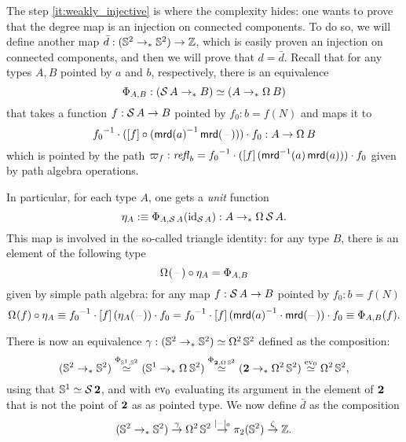 \documentclass[english,a4]{article}
\renewcommand{\ap}[1]{\left[{#1}\right]}
\newcommand{\ptdto}{\to_\ast}%
\newcommand{\settrunc}[1]{\trunc{#1}_0}
\begin{document}
The step \ref{it:weakly_injective} 
is where the complexity hides: one wants to prove that the degree
map is an injection on connected components. To do so, we will define
another map $\bar d: (\Sp \ptdto \Sp) \to \ZZ$, which is easily proven an
injection on connected components, and then we will prove that $d = \bar d$.
Recall that for any types $A,B$ pointed by $a$ and $b$,
respectively, there is an equivalence
\begin{displaymath}
  \Phi_{A,B}: (\susp A \ptdto B) \weq (A \ptdto \loopspace \null B) 
\end{displaymath}
that takes a function $f:\operatorname{\mathcal S} A \to B$ pointed by $f_0:b=f(N)$ and maps it to 
\begin{displaymath}
  \inv {f_0}\cdot (\ap f\circ (\inv{\mrd(a)}\mrd(\blank)))\cdot f_0 : A \to \loopspace\null B
\end{displaymath}
which is pointed by the path $\varpi_{f}:\refl b = \inv {f_0} \cdot (\ap f (\inv
\mrd(a)\mrd(a))) \cdot f_0$ given by path algebra operations.

In particular, for each type $A$, one gets a {\em unit} function 
\begin{displaymath}
  \eta_A \defequi \Phi_{A,\susp A}(\id_{\susp A}): A \ptdto \loopspace\null\susp A.
\end{displaymath}
This map is involved in the so-called triangle identity: for any type $B$,
there is an element of the following type
\begin{equation}
  \loopspace\null(\blank) \circ \eta_A = \Phi_{A,B}
  \label{eq:triangle-identity-unit}
\end{equation}
given by simple path algebra: for any map $f:\operatorname{\mathcal S} A \to B$ pointed by $f_0:b=f(N)$
\begin{displaymath}
  \loopspace\null(f) \circ \eta_A \jdeq \inv {f_0} \cdot \ap f (\eta_A(\blank)) \cdot f_0 
  = \inv {f_0} \cdot \ap f (\inv{\mrd(a)}\cdot\mrd(\blank)) \cdot f_0 \jdeq \Phi_{A,B}(f). 
\end{displaymath}

There is now an equivalence $\gamma:(\Sp \ptdto \Sp) \weq \loopspace 2 \Sp$ defined as
the composition:
\begin{displaymath}
  (\Sp \ptdto \Sp) \stackrel{\Phi_{\Sc,\Sp}}\weq 
  (\Sc \ptdto\loopspace\null \Sp) \stackrel{\Phi_{\bn 2,\loopspace\null\Sp}}\weq 
  (\bn 2\ptdto\loopspace 2 \Sp) \stackrel{\ev_0}\weq 
  \loopspace 2 \Sp,
\end{displaymath}
using that ${{\mathbb S^{1}}} \simeq \operatorname{\mathcal S}{\mathbf{2}}$, and with $\mathrm{ev}_0$ evaluating its argument 
in the element of $\mathbf{2}$ that is not the point of $\mathbf{2}$ as as pointed type.					
We now define $\bar d$ as the composition
\begin{displaymath}
  (\Sp \ptdto \Sp) \stackrel \gamma \to \loopspace 2 \Sp \stackrel {\settrunc\blank} \to 
  \pi_2(\Sp) \stackrel \zeta \to \ZZ.
\end{displaymath}
\end{document}
